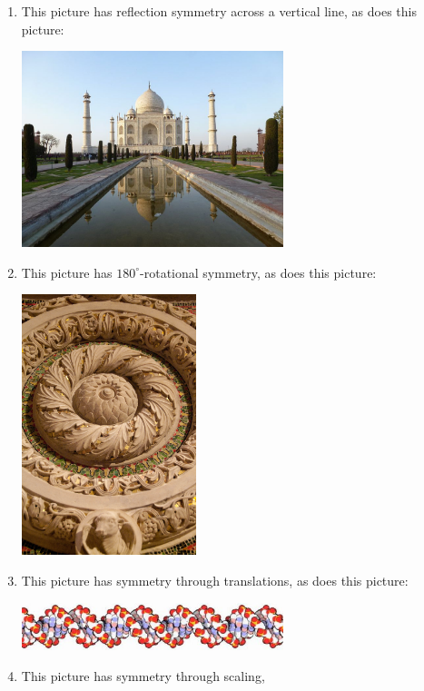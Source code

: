 \documentclass[noauthor,nooutcomes,12pt,handout]{ximera}
\begin{document}
\begin{question}
  \begin{freeResponse}
    \begin{enumerate}
    \item This picture has reflection symmetry across a vertical line,
      as does this picture:
      \begin{center}
        \includegraphics[width=3in]{tajMahal.jpg}
      \end{center}
    \item This picture has $180^\circ$-rotational symmetry,
      as does this picture:
      \begin{center}
        \includegraphics[width=2in]{spin.jpg}
      \end{center}
    \item This picture has symmetry through translations,
      as does this picture:
      \begin{center}
        \includegraphics[width=3in]{dna.jpg}
      \end{center}
    \item This picture has symmetry through scaling,

\end{enumerate}
\end{freeResponse}
\end{question}
\end{document}
